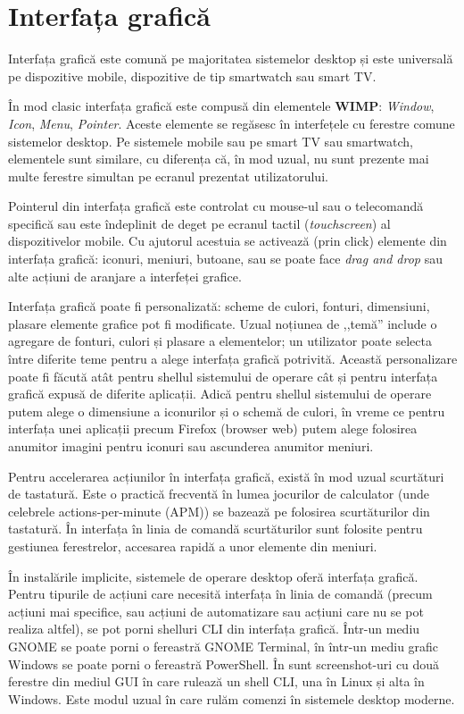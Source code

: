 \section{Interfața grafică}
\label{sec:ui:gui}

Interfața grafică este comună pe majoritatea sistemelor desktop și este universală pe dispozitive mobile, dispozitive de tip smartwatch sau smart TV.

În mod clasic interfața grafică este compusă din elementele \textbf{WIMP}: \textit{Window}, \textit{Icon}, \textit{Menu}, \textit{Pointer}. Aceste elemente se regăsesc în interfețele cu ferestre comune sistemelor desktop. Pe sistemele mobile sau pe smart TV sau smartwatch, elementele sunt similare, cu diferența că, în mod uzual, nu sunt prezente mai multe ferestre simultan pe ecranul prezentat utilizatorului.

Pointerul din interfața grafică este controlat cu mouse-ul sau o telecomandă specifică sau este îndeplinit de deget pe ecranul tactil (\textit{touchscreen}) al dispozitivelor mobile. Cu ajutorul acestuia se activează (prin click) elemente din interfața grafică: iconuri, meniuri, butoane, sau se poate face \textit{drag and drop} sau alte acțiuni de aranjare a interfeței grafice.

Interfața grafică poate fi personalizată: scheme de culori, fonturi, dimensiuni, plasare elemente grafice pot fi modificate. Uzual noțiunea de ,,temă'' include o agregare de fonturi, culori și plasare a elementelor; un utilizator poate selecta între diferite teme pentru a alege interfața grafică potrivită. Această personalizare poate fi făcută atât pentru shellul sistemului de operare cât și pentru interfața grafică expusă de diferite aplicații. Adică pentru shellul sistemului de operare putem alege o dimensiune a iconurilor și o schemă de culori, în vreme ce pentru interfața unei aplicații precum Firefox (browser web) putem alege folosirea anumitor imagini pentru iconuri sau ascunderea anumitor meniuri.

Pentru accelerarea acțiunilor în interfața grafică, există în mod uzual scurtături de tastatură. Este o practică frecventă în lumea jocurilor de calculator (unde celebrele actions-per-minute (APM)) se bazează pe folosirea scurtăturilor din tastatură. În interfața în linia de comandă scurtăturilor sunt folosite pentru gestiunea ferestrelor, accesarea rapidă a unor elemente din meniuri.

În instalările implicite, sistemele de operare desktop oferă interfața grafică. Pentru tipurile de acțiuni care necesită interfața în linia de comandă (precum acțiuni mai specifice, sau acțiuni de automatizare sau acțiuni care nu se pot realiza altfel), se pot porni shelluri CLI din interfața grafică. Într-un mediu GNOME se poate porni o fereastră GNOME Terminal, în într-un mediu grafic Windows se poate porni o fereastră PowerShell. În  sunt screenshot-uri cu două ferestre din mediul GUI în care rulează un shell CLI, una în Linux și alta în Windows. Este modul uzual în care rulăm comenzi în sistemele desktop moderne.

